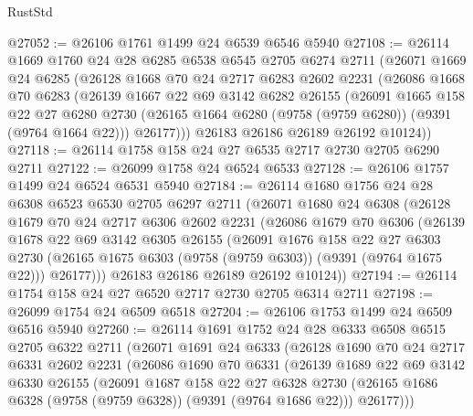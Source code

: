 \begin{lexlean}{RustStd}
\begin{coremodule}
@27052 := @26106 @1761 @1499 @24 @6539 @6546 @5940
@27108 := @26114
    @1669
    @1760
    @24
    @28
    @6285
    @6538
    @6545
    @2705
    @6274
    @2711
    (@26071
      @1669
      @24
      @6285
      (@26128
        @1668
        @70
        @24
        @2717
        @6283
        @2602
        @2231
        (@26086
          @1668
          @70
          @6283
          (@26139
            @1667
            @22
            @69
            @3142
            @6282
            @26155
            (@26091
              @1665
              @158
              @22
              @27
              @6280
              @2730
              (@26165 @1664 @6280 (@9758 (@9759 @6280)) (@9391 (@9764 @1664 @22)))
              @26177)))
        @26183
        @26186
        @26189
        @26192
        @10124))
@27118 := @26114 @1758 @158 @24 @27 @6535 @2717 @2730 @2705 @6290 @2711
@27122 := @26099 @1758 @24 @6524 @6533
@27128 := @26106 @1757 @1499 @24 @6524 @6531 @5940
@27184 := @26114
    @1680
    @1756
    @24
    @28
    @6308
    @6523
    @6530
    @2705
    @6297
    @2711
    (@26071
      @1680
      @24
      @6308
      (@26128
        @1679
        @70
        @24
        @2717
        @6306
        @2602
        @2231
        (@26086
          @1679
          @70
          @6306
          (@26139
            @1678
            @22
            @69
            @3142
            @6305
            @26155
            (@26091
              @1676
              @158
              @22
              @27
              @6303
              @2730
              (@26165 @1675 @6303 (@9758 (@9759 @6303)) (@9391 (@9764 @1675 @22)))
              @26177)))
        @26183
        @26186
        @26189
        @26192
        @10124))
@27194 := @26114 @1754 @158 @24 @27 @6520 @2717 @2730 @2705 @6314 @2711
@27198 := @26099 @1754 @24 @6509 @6518
@27204 := @26106 @1753 @1499 @24 @6509 @6516 @5940
@27260 := @26114
    @1691
    @1752
    @24
    @28
    @6333
    @6508
    @6515
    @2705
    @6322
    @2711
    (@26071
      @1691
      @24
      @6333
      (@26128
        @1690
        @70
        @24
        @2717
        @6331
        @2602
        @2231
        (@26086
          @1690
          @70
          @6331
          (@26139
            @1689
            @22
            @69
            @3142
            @6330
            @26155
            (@26091
              @1687
              @158
              @22
              @27
              @6328
              @2730
              (@26165 @1686 @6328 (@9758 (@9759 @6328)) (@9391 (@9764 @1686 @22)))
              @26177)))

\end{coremodule}
\end{lexlean}
